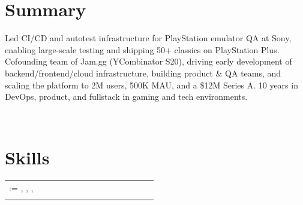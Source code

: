 \documentclass{muratcan_cv}
\makeatletter
\renewcommand{\explanationdetail}[1]{%
    \indent \indent \begin{minipage}{0.87\linewidth} \scriptsize #1 \end{minipage} \\[0.03cm]
}
\renewcommand\createskills[1]{%
    \explanationdetail{
        \scriptsize
        \setlength{\tabcolsep}{1.5pt}
        \begin{tabular}{>{\raggedright\arraybackslash}p{0.22\linewidth} >{\raggedright\arraybackslash}p{0.65\linewidth}}
            \@for\thisitem:=#1\do{\thisitem \\[0.03cm]}
        \end{tabular}
    }
}
\makeatother
\begin{document}
\headerview
\vspace{0.6ex}

\section{Summary}
\explanationdetail{
    Led CI/CD and autotest infrastructure for PlayStation emulator QA at Sony, enabling large-scale testing and shipping 50+ classics on PlayStation Plus. Cofounding team of Jam.gg (YCombinator S20), driving early development of backend/frontend/cloud infrastructure, building product \& QA teams, and scaling the platform to 2M users, 500K MAU, and a \$12M Series A. 10 years in DevOps, product, and fullstack in gaming and tech environments.
}
\vspace{0.8ex}

\section{Skills}
\createskills{
    \createskill{Languages}{Python \cpshalf React \cpshalf Go \cpshalf C++ \cpshalf TypeScript \cpshalf Java \cpshalf Bash \cpshalf SQL},
    \createskill{Cloud \& DevOps}{GitHub Actions \cpshalf AWS \cpshalf GCP \cpshalf GitLab CI \cpshalf Docker \cpshalf Kubernetes},
    \createskill{AI \& Engines}{OpenAI / Claude \cpshalf RAG (Pinecone) \cpshalf Unity \cpshalf UE5 \cpshalf Figma \cpshalf Linear},
    \createskill{Practices}{CI/CD \cpshalf QA Automation \cpshalf Product \cpshalf Leadership \cpshalf Agile}
}
\vspace{-3.6mm}
\end{document}
